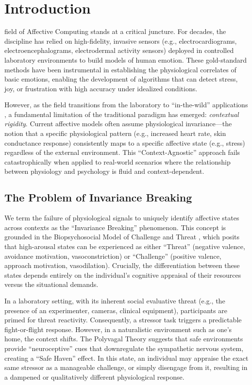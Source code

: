\section{Introduction}

 field of Affective Computing \cite{picard_affective_computing} stands at a critical juncture. For decades, the discipline has relied on high-fidelity, invasive sensors (e.g., electrocardiograms, electroencephalograms, electrodermal activity sensors) deployed in controlled laboratory environments to build models of human emotion. These gold-standard methods have been instrumental in establishing the physiological correlates of basic emotions, enabling the development of algorithms that can detect stress, joy, or frustration with high accuracy under idealized conditions.

However, as the field transitions from the laboratory to ``in-the-wild'' applications \cite{ambulatory_assessment}, a fundamental limitation of the traditional paradigm has emerged: \textit{contextual rigidity}. Current affective models often assume physiological invariance—the notion that a specific physiological pattern (e.g., increased heart rate, skin conductance response) consistently maps to a specific affective state (e.g., stress) regardless of the external environment. This ``Context-Agnostic'' approach fails catastrophically when applied to real-world scenarios where the relationship between physiology and psychology is fluid and context-dependent.

\subsection{The Problem of Invariance Breaking}
We term the failure of physiological signals to uniquely identify affective states across contexts as the ``Invariance Breaking'' phenomenon. This concept is grounded in the Biopsychosocial Model of Challenge and Threat \cite{biopsychosocial_model}, which posits that high-arousal states can be experienced as either ``Threat'' (negative valence, avoidance motivation, vasoconstriction) or ``Challenge'' (positive valence, approach motivation, vasodilation). Crucially, the differentiation between these states depends entirely on the individual's cognitive appraisal of their resources versus the situational demands.

In a laboratory setting, with its inherent social evaluative threat (e.g., the presence of an experimenter, cameras, clinical equipment), participants are primed for threat reactivity. Consequently, a stressor task triggers a predictable fight-or-flight response. However, in a naturalistic environment such as one's home, the context shifts. The Polyvagal Theory \cite{polyvagal, porges_safe_haven} suggests that safe environments provide ``neuroceptive'' cues that downregulate the sympathetic nervous system, creating a ``Safe Haven'' effect. In this state, an individual may appraise the exact same stressor as a manageable challenge, or simply disengage from it, resulting in a dampened or qualitatively different physiological response.

